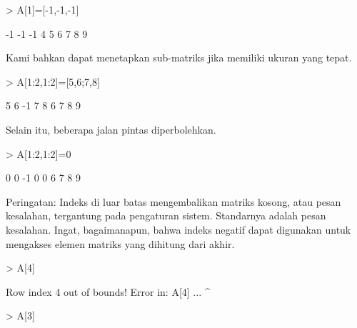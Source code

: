 \documentclass[a4paper,10pt]{article}
\begin{document}
\begin{eulernotebook}
\begin{eulercomment}
\begin{eulercomment}
\begin{eulercomment}
\begin{eulercomment}
\begin{eulercomment}
\begin{eulercomment}
\begin{eulercomment}
\end{eulercomment}
\begin{eulerprompt}
> A[1]=[-1,-1,-1]
\end{eulerprompt}
\begin{euleroutput}
             -1            -1            -1 
              4             5             6 
              7             8             9 
\end{euleroutput}
\begin{eulercomment}
Kami bahkan dapat menetapkan sub-matriks jika memiliki ukuran yang
tepat.
\end{eulercomment}
\begin{eulerprompt}
> A[1:2,1:2]=[5,6;7,8]
\end{eulerprompt}
\begin{euleroutput}
              5             6            -1 
              7             8             6 
              7             8             9 
\end{euleroutput}
\begin{eulercomment}
Selain itu, beberapa jalan pintas diperbolehkan.
\end{eulercomment}
\begin{eulerprompt}
> A[1:2,1:2]=0
\end{eulerprompt}
\begin{euleroutput}
              0             0            -1 
              0             0             6 
              7             8             9 
\end{euleroutput}
\begin{eulercomment}
Peringatan: Indeks di luar batas mengembalikan matriks kosong, atau
pesan kesalahan, tergantung pada pengaturan sistem. Standarnya adalah
pesan kesalahan. Ingat, bagaimanapun, bahwa indeks negatif dapat
digunakan untuk mengakses elemen matriks yang dihitung dari akhir.
\end{eulercomment}
\begin{eulerprompt}
> A[4]
\end{eulerprompt}
\begin{euleroutput}
  Row index 4 out of bounds!
  Error in:
   A[4] ...
       ^
\end{euleroutput}
\begin{eulerprompt}
> A[3]
\end{eulerprompt}
\begin{euleroutput}
  [7,  8,  9]
\end{euleroutput}
\begin{eulercomment}

\end{eulercomment}
\end{eulercomment}
\end{eulercomment}
\end{eulercomment}
\end{eulercomment}
\end{eulercomment}
\end{eulercomment}
\end{eulernotebook}
\end{document}
